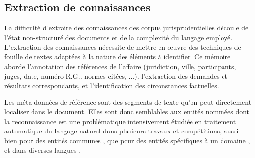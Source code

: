 
\subsection{Extraction de connaissances}
\label{subsec:intro:ie}
La difficulté d'extraire des connaissances des corpus jurisprudentielles découle de l'état non-structuré des documents et de la complexité du langage employé. L'extraction des connaissances nécessite de mettre en \oe uvre des techniques de fouille de textes adaptées à la nature des éléments à identifier. Ce mémoire aborde l'annotation des références de l'affaire (juridiction, ville, participants, juges, date, numéro R.G., normes citées, ...), l'extraction des demandes et résultats correspondants, et l'identification des circonstances factuelles.

Les méta-données de référence sont des segments de texte qu'on peut directement localiser dans le document. Elles sont donc semblables aux entités nommées dont la reconnaissance est une problématique intensivement étudiée en traitement automatique du langage naturel \citep{yadav2018surveyNeuralNER} dans plusieurs travaux et compétitions, aussi bien pour des entités communes \citep{tjong2003introCoNLL,grishman1996muc6}, que pour des entités spécifiques à un domaine \citep{kim2004bioNer, persson2012nbbioner,hanisch2005prominer}, et dans diverses langues \citep{li2018wcpbioner,alfred2014malayner,amarappa2015kannada}. 

